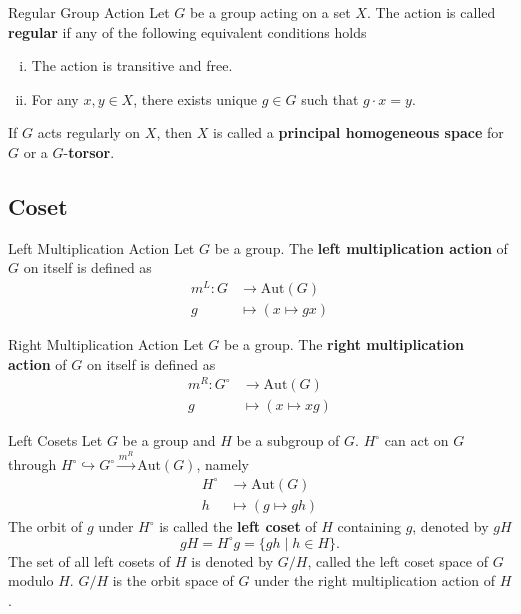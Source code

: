 \begin{definition}{Regular Group Action}{}
    Let $G$ be a group acting on a set $X$. The action is called \textbf{regular} if any of the following equivalent conditions holds
    \begin{enumerate}[(i)]
        \item The action is transitive and free.
        \item For any $x,y\in X$, there exists unique $g\in G$ such that $g\cdot x=y$.
    \end{enumerate}
    If $G$ acts regularly on $X$, then $X$ is called a \textbf{principal homogeneous space} for $G$ or a $G$-\textbf{torsor}.
\end{definition}

\subsection{Coset}
\begin{example}{Left Multiplication Action}{}
    Let $G$ be a group. The \textbf{left multiplication action} of $G$ on itself is defined as
    \begin{align*}
        m^L:G & \longrightarrow \mathrm{Aut}(G) \\
        g     & \longmapsto ( x\longmapsto gx)
    \end{align*}
\end{example}

\begin{example}{Right Multiplication Action}{}
    Let $G$ be a group. The \textbf{right multiplication action} of $G$ on itself is defined as
    \begin{align*}
        m^R:G^\circ & \longrightarrow \mathrm{Aut}(G) \\
        g           & \longmapsto ( x\longmapsto xg)
    \end{align*}
\end{example}

\begin{definition}{Left Cosets}{}
    Let $G$ be a group and $H$ be a subgroup of $G$. $H^\circ$ can act on $G$ through $H^\circ\hookrightarrow G^\circ\stackrel{m^R}{\longrightarrow} \mathrm{Aut}(G)$, namely
    \begin{align*}
        H^\circ & \longrightarrow \mathrm{Aut}(G) \\
        h       & \longmapsto  (g\longmapsto gh)
    \end{align*}
    The orbit of $g$ under $H^\circ$ is called the \textbf{left coset} of $H$ containing $g$, denoted by $gH$
    \[
        gH = H^\circ g = \{ gh\mid h\in H\}.
    \]
    The set of all left cosets of $H$ is denoted by $G/H$, called the left coset space of $G$ modulo $H$. $G/H$ is the orbit space of $G$ under the right multiplication action of $H$.
\end{definition}

